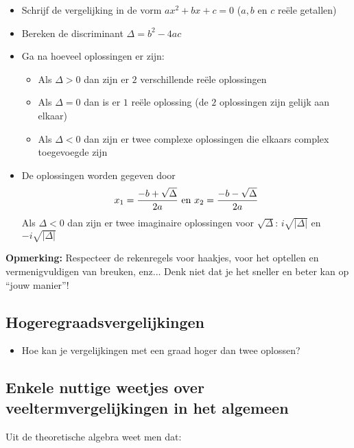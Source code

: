 \begin{framed}
\begin{itemize}
\item Schrijf de vergelijking in de vorm $ax^2 + bx + c = 0$ ($a,b$ en $c$ re\"{e}le getallen)
\item Bereken de discriminant $\Delta = b^2 - 4ac$
\item Ga na hoeveel oplossingen er zijn:
        \begin{itemize} \item Als $\Delta >0$ dan zijn er $2$ verschillende re\"{e}le oplossingen \item Als $\Delta=0$ dan is er $1$ re\"{e}le oplossing (de $2$ oplossingen zijn gelijk aan elkaar) \item Als $\Delta <0$ dan zijn er twee complexe oplossingen die elkaars complex toegevoegde zijn \end{itemize}
\item De oplossingen worden gegeven door
\[ x_{1}=\frac{-b + \sqrt{\Delta}}{2a} \textup{  en  } x_{2}=\frac{-b - \sqrt{\Delta}}{2a} \] 
Als $\Delta <0$ dan zijn er twee imaginaire oplossingen voor $\sqrt{\Delta}$: $i\sqrt{|\Delta|}$ en $-i\sqrt{|\Delta|}$ 
\end{itemize}

{\bf Opmerking:} Respecteer de rekenregels voor haakjes, voor het optellen en vermenigvuldigen van breuken, enz...  Denk niet dat je het sneller en beter kan op ``jouw manier''!\\

\end{framed}

\newpage

\subsection{Hogeregraadsvergelijkingen}

\begin{itemize}
	\item Hoe kan je vergelijkingen met een graad hoger dan twee oplossen?
\end{itemize}

\subsection{Enkele nuttige weetjes over veeltermvergelijkingen in het algemeen}

Uit de theoretische algebra weet men dat:


